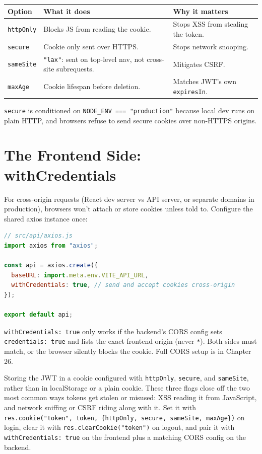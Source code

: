 \begin{center}
\begin{tabularx}{\textwidth}{lXX}
\toprule
\textbf{Option} & \textbf{What it does} & \textbf{Why it matters} \\
\midrule
\texttt{httpOnly} & Blocks JS from reading the cookie. & Stops XSS from stealing the token. \\
\texttt{secure} & Cookie only sent over HTTPS. & Stops network snooping. \\
\texttt{sameSite} & \texttt{"lax"}: sent on top-level nav, not cross-site subrequests. & Mitigates CSRF. \\
\texttt{maxAge} & Cookie lifespan before deletion. & Matches JWT's own \texttt{expiresIn}. \\
\bottomrule
\end{tabularx}
\end{center}

\begin{notebox}[NOTE]
\texttt{secure} is conditioned on \texttt{NODE\_ENV === "production"} because local dev runs on plain HTTP, and browsers refuse to send secure cookies over non-HTTPS origins.
\end{notebox}

\section{The Frontend Side: withCredentials}

For cross-origin requests (React dev server vs API server, or separate domains in production), browsers won't attach or store cookies unless told to. Configure the shared axios instance once:

\begin{lstlisting}[language=JavaScript]
// src/api/axios.js
import axios from "axios";

const api = axios.create({
  baseURL: import.meta.env.VITE_API_URL,
  withCredentials: true, // send and accept cookies cross-origin
});

export default api;
\end{lstlisting}

\begin{warnbox}[WARNING]
\texttt{withCredentials: true} only works if the backend's CORS config sets \texttt{credentials: true} and lists the exact frontend origin (never \texttt{*}). Both sides must match, or the browser silently blocks the cookie. Full CORS setup is in Chapter 26.
\end{warnbox}

\whatwhyhow
{Storing the JWT in a cookie configured with \texttt{httpOnly}, \texttt{secure}, and \texttt{sameSite}, rather than in localStorage or a plain cookie.}
{These three flags close off the two most common ways tokens get stolen or misused: XSS reading it from JavaScript, and network sniffing or CSRF riding along with it.}
{Set it with \texttt{res.cookie("token", token, \{httpOnly, secure, sameSite, maxAge\})} on login, clear it with \texttt{res.clearCookie("token")} on logout, and pair it with \texttt{withCredentials: true} on the frontend plus a matching CORS config on the backend.}
